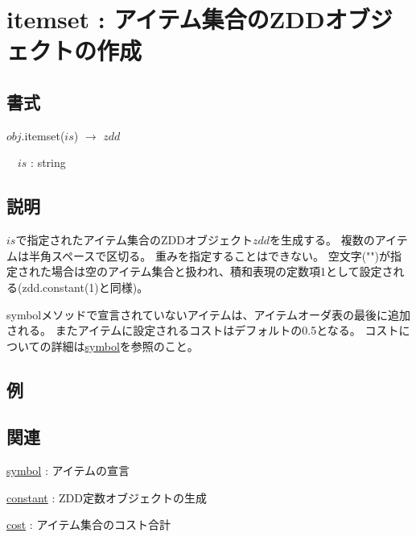 
\section{itemset : アイテム集合のZDDオブジェクトの作成\label{sect:itemset}}
\subsection*{書式}
$obj$.itemset($is$) $\rightarrow$ $zdd$

~~$is$ : string

\subsection*{説明}
$is$で指定されたアイテム集合のZDDオブジェクト$zdd$を生成する。
複数のアイテムは半角スペースで区切る。
重みを指定することはできない。
空文字("")が指定された場合は空のアイテム集合と扱われ、積和表現の定数項1として設定される(zdd.constant(1)と同様)。

symbolメソッドで宣言されていないアイテムは、アイテムオーダ表の最後に追加される。
またアイテムに設定されるコストはデフォルトの0.5となる。
コストについての詳細は\hyperref[sect:symbol]{symbol}を参照のこと。

\subsection*{例}


\subsection*{関連}
\hyperref[sect:symbol]{symbol} : アイテムの宣言

\hyperref[sect:constant]{constant} : ZDD定数オブジェクトの生成

\hyperref[sect:cost]{cost} : アイテム集合のコスト合計


